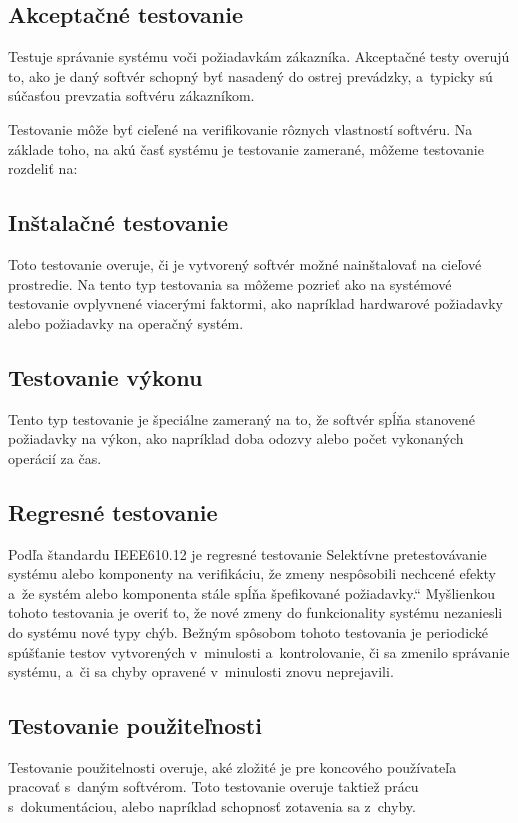 \subsection*{Akceptačné testovanie}
Testuje správanie systému voči požiadavkám zákazníka. Akceptačné testy overujú to, ako je daný softvér 
schopný byť nasadený do ostrej prevádzky, a~typicky sú súčasťou prevzatia softvéru zákazníkom.

Testovanie môže byť cieľené na verifikovanie rôznych vlastností softvéru. Na základe toho, na akú časť systému je 
testovanie zamerané, môžeme testovanie rozdeliť na:
\subsection*{Inštalačné testovanie}
Toto testovanie overuje, či je vytvorený softvér možné nainštalovať
na cieľové prostredie. Na tento typ testovania sa môžeme pozrieť ako na 
systémové testovanie ovplyvnené viacerými faktormi, ako napríklad hardwarové požiadavky
alebo požiadavky na operačný systém. 
\subsection*{Testovanie výkonu}
Tento typ testovanie je špeciálne zameraný na to, že softvér spĺňa stanovené požiadavky 
na výkon, ako napríklad doba odozvy alebo počet vykonaných operácií za čas. 
\subsection*{Regresné testovanie} \label{sekcia:regresne_testovanie}
Podľa štandardu IEEE610.12 \cite{Ieee_glossary} je regresné testovanie \quotedblbase Selektívne pretestovávanie 
systému alebo komponenty na verifikáciu, že zmeny nespôsobili nechcené efekty a~že systém alebo
komponenta stále spĺňa špefikované požiadavky.\textquotedblleft
Myšlienkou tohoto testovania je overiť to, že nové zmeny do funkcionality systému nezaniesli do systému nové typy chýb.
Bežným spôsobom tohoto testovania je periodické spúšťanie testov vytvorených v~minulosti a~kontrolovanie, či sa zmenilo správanie
systému, a~či sa chyby opravené v~minulosti znovu neprejavili.
\subsection*{Testovanie použiteľnosti}
Testovanie použitelnosti overuje, aké zložité je pre koncového používateľa pracovať s~daným softvérom.
Toto testovanie overuje taktiež prácu s~dokumentáciou, alebo napríklad schopnosť zotavenia sa z~chyby. 

